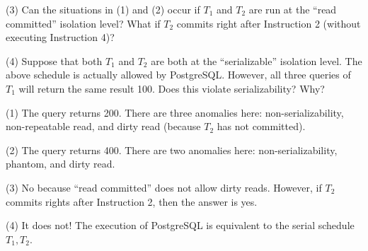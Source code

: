 \vgap

(3) Can the situations in (1) and (2) occur if $T_1$ and $T_2$ are run at the ``read committed'' isolation level? What if $T_2$ commits right after Instruction 2 (without executing Instruction 4)?

\vgap

(4) Suppose that both $T_1$ and $T_2$ are both at the ``serializable'' isolation level. The above schedule is actually allowed by PostgreSQL. However, all three queries of $T_1$ will return the same result 100. Does this violate serializability? Why?

\begin{sol}
     (1) The query returns 200. There are three anomalies here: non-serializability, non-repeatable read, and dirty read (because $T_2$ has not committed).

    \vgap

    (2) The query returns 400. There are two anomalies here: non-serializability, phantom, and dirty read.

    \vgap

    (3) No because ``read committed'' does not allow dirty reads. However, if $T_2$ commits rights after Instruction 2, then the answer is yes.

    \vgap

    (4) It does not! The execution of PostgreSQL is equivalent to the serial schedule $T_1, T_2$.
\end{sol}



